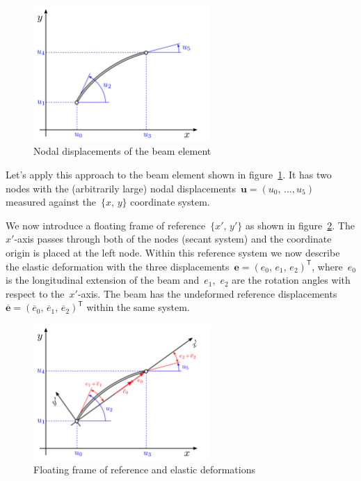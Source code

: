 \begin{figure}[h]
\centering
\includegraphics[width=0.6\textwidth]{figures/elements/beam-element-1}
\caption{Nodal displacements of the beam element}
\label{fig:beam-element-1}
\end{figure}

Let's apply this approach to the beam element shown in figure~\ref{fig:beam-element-1}. It has two nodes with the (arbitrarily large) nodal displacements~$\boldsymbol{u} = (u_0,\,\ldots,u_5)$ measured against the~$\{x,\,y\}$ coordinate system.

We now introduce a floating frame of reference~$\{x',\,y'\}$ as shown in figure~\ref{fig:beam-element-2}. The $x'$-axis passes through both of the nodes (secant system) and the coordinate origin is placed at the left node. Within this reference system we now describe the elastic deformation with the three displacements~$\boldsymbol{e} = (e_0,\,e_1,\,e_2)^\mathsf{T}$, where~$e_0$ is the longitudinal extension of the beam and~$e_1$,~$e_2$ are the rotation angles with respect to the~$x'$-axis. The beam has the undeformed reference displacements $\overline{\boldsymbol{e}} = (\overline{e}_0,\,\overline{e}_1,\,\overline{e}_2)^\mathsf{T}$ within the same system.

\begin{figure}[h]
\centering
\includegraphics[width=0.6\textwidth]{figures/elements/beam-element-2}
\caption{Floating frame of reference and elastic deformations}
\label{fig:beam-element-2}
\end{figure}

